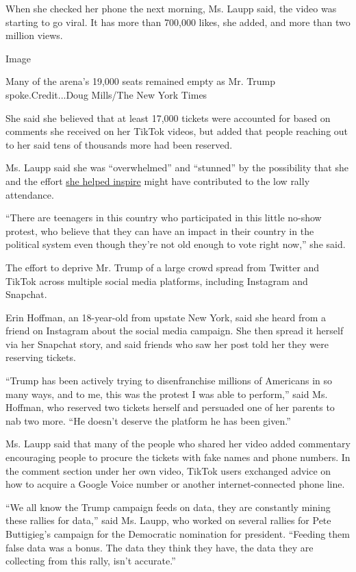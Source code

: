 When she checked her phone the next morning, Ms. Laupp said, the video
was starting to go viral. It has more than 700,000 likes, she added, and
more than two million views.

Image

Many of the arena's 19,000 seats remained empty as Mr. Trump
spoke.Credit...Doug Mills/The New York Times

She said she believed that at least 17,000 tickets were accounted for
based on comments she received on her TikTok videos, but added that
people reaching out to her said tens of thousands more had been
reserved.

Ms. Laupp said she was ``overwhelmed'' and ``stunned'' by the
possibility that she and the effort
\href{https://www.tiktok.com/@maryjolaupp/video/6840619115585998085}{she
helped inspire} might have contributed to the low rally attendance.

``There are teenagers in this country who participated in this little
no-show protest, who believe that they can have an impact in their
country in the political system even though they're not old enough to
vote right now,'' she said.

The effort to deprive Mr. Trump of a large crowd spread from Twitter and
TikTok across multiple social media platforms, including Instagram and
Snapchat.

Erin Hoffman, an 18-year-old from upstate New York, said she heard from
a friend on Instagram about the social media campaign. She then spread
it herself via her Snapchat story, and said friends who saw her post
told her they were reserving tickets.

``Trump has been actively trying to disenfranchise millions of Americans
in so many ways, and to me, this was the protest I was able to
perform,'' said Ms. Hoffman, who reserved two tickets herself and
persuaded one of her parents to nab two more. ``He doesn't deserve the
platform he has been given.''

Ms. Laupp said that many of the people who shared her video added
commentary encouraging people to procure the tickets with fake names and
phone numbers. In the comment section under her own video, TikTok users
exchanged advice on how to acquire a Google Voice number or another
internet-connected phone line.

``We all know the Trump campaign feeds on data, they are constantly
mining these rallies for data,'' said Ms. Laupp, who worked on several
rallies for Pete Buttigieg's campaign for the Democratic nomination for
president. ``Feeding them false data was a bonus. The data they think
they have, the data they are collecting from this rally, isn't
accurate.''

